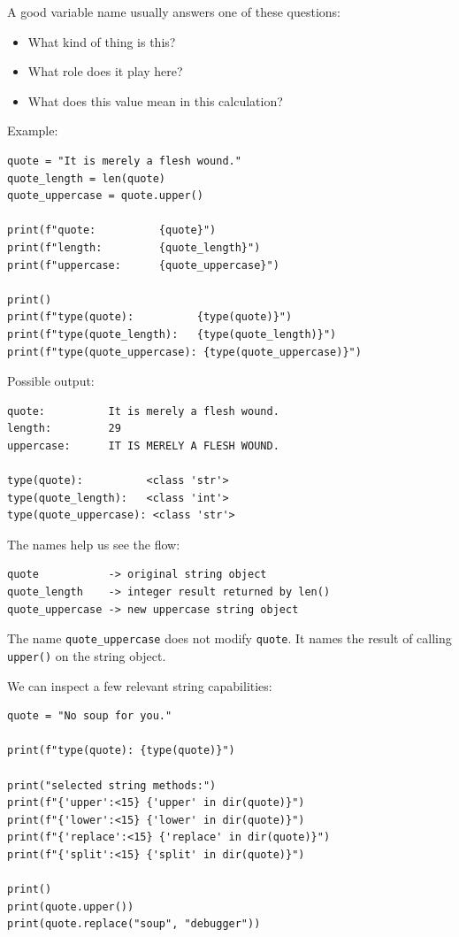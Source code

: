 A good variable name usually answers one of these questions:

\begin{itemize}
    \item What kind of thing is this?
    \item What role does it play here?
    \item What does this value mean in this calculation?
\end{itemize}

Example:

\begin{verbatim}
quote = "It is merely a flesh wound."
quote_length = len(quote)
quote_uppercase = quote.upper()

print(f"quote:          {quote}")
print(f"length:         {quote_length}")
print(f"uppercase:      {quote_uppercase}")

print()
print(f"type(quote):          {type(quote)}")
print(f"type(quote_length):   {type(quote_length)}")
print(f"type(quote_uppercase): {type(quote_uppercase)}")
\end{verbatim}

Possible output:

\begin{verbatim}
quote:          It is merely a flesh wound.
length:         29
uppercase:      IT IS MERELY A FLESH WOUND.

type(quote):          <class 'str'>
type(quote_length):   <class 'int'>
type(quote_uppercase): <class 'str'>
\end{verbatim}

The names help us see the flow:

\begin{verbatim}
quote           -> original string object
quote_length    -> integer result returned by len()
quote_uppercase -> new uppercase string object
\end{verbatim}

The name \texttt{quote\_uppercase} does not modify \texttt{quote}. It names the result of calling \texttt{upper()} on the string object.

We can inspect a few relevant string capabilities:

\begin{verbatim}
quote = "No soup for you."

print(f"type(quote): {type(quote)}")

print("selected string methods:")
print(f"{'upper':<15} {'upper' in dir(quote)}")
print(f"{'lower':<15} {'lower' in dir(quote)}")
print(f"{'replace':<15} {'replace' in dir(quote)}")
print(f"{'split':<15} {'split' in dir(quote)}")

print()
print(quote.upper())
print(quote.replace("soup", "debugger"))
\end{verbatim}

